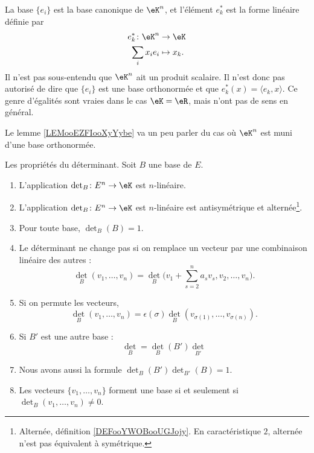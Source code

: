 \begin{normaltext}
	La base \( \{ e_i \}\) est la base canonique de \( \eK^n\), et l'élément \( e_k^*\) est la forme linéaire définie par
	\begin{equation}
		\begin{aligned}
			e_k^*\colon \eK^n & \to \eK      \\
			\sum_ix_ie_i      & \mapsto x_k.
		\end{aligned}
	\end{equation}
	Il n'est pas sous-entendu que \( \eK^n\) ait un produit scalaire. Il n'est donc pas autorisé de dire que \( \{ e_i \}\) est une base orthonormée et que \( e^*_k(x)=\langle e_k, x\rangle \). Ce genre d'égalités sont vraies dans le cas \( \eK=\eR\), mais n'ont pas de sens en général.

	Le lemme \ref{LEMooEZFIooXyYybe} va un peu parler du cas où \( \eK^n\) est muni d'une base orthonormée.
\end{normaltext}

\begin{lemma}     \label{LemJMWCooELZuho}
	Les propriétés du déterminant. Soit \( B\) une base de \( E\).
	\begin{enumerate}
		\item\label{ITEMooAHOHooDZgtSB}
		L'application \( \det_B\colon E^n\to \eK\) est \( n\)-linéaire.
		\item\label{ITEMooTXXBooBmDtzd}
		L'application \( \det_B\colon E^n\to \eK\) est \( n\)-linéaire est antisymétrique et alternée\footnote{Alternée, définition \ref{DEFooYWOBooUGJojy}. En caractéristique \( 2\), alternée n'est pas équivalent à symétrique.}.
		\item   \label{ITEMooNFJTooTqGoPr}
		      Pour toute base, \( \det_B(B)=1\).
		\item   \label{ITEMooALRQooDvBzDQ}
		      Le déterminant ne change pas si on remplace un vecteur par une combinaison linéaire des autres :
		      \begin{equation}
			      \det_B(v_1,\ldots, v_n)=\det_B\big( v_1+\sum_{s=2}^na_sv_s,v_2,\ldots, v_n \big).
		      \end{equation}
		\item   \label{ITEMooQTTRooMbzqyW}
		      Si on permute les vecteurs,
		      \begin{equation}
			      \det_B(v_1,\ldots, v_n)=\epsilon(\sigma)\det_B(v_{\sigma(1)},\ldots, v_{\sigma(n)}).
		      \end{equation}
		\item   \label{ITEMooIPIDooTrerVF}
		      Si \( B'\) est une autre base :
		      \begin{equation}        \label{EqAWICooBLTTOY}
			      \det_B=\det_B(B')\det_{B'}
		      \end{equation}
		\item   \label{ITEMooXKTAooXynFTE}
		      Nous avons aussi la formule \( \det_{B}(B')\det_{B'}(B)=1\).
		      \item\label{ItemDWFLooDUePAf}
		      Les vecteurs \( \{ v_1,\ldots, v_n \}\) forment une base si et seulement si \( \det_B(v_1,\ldots, v_n)\neq 0\).
	\end{enumerate}
\end{lemma}

